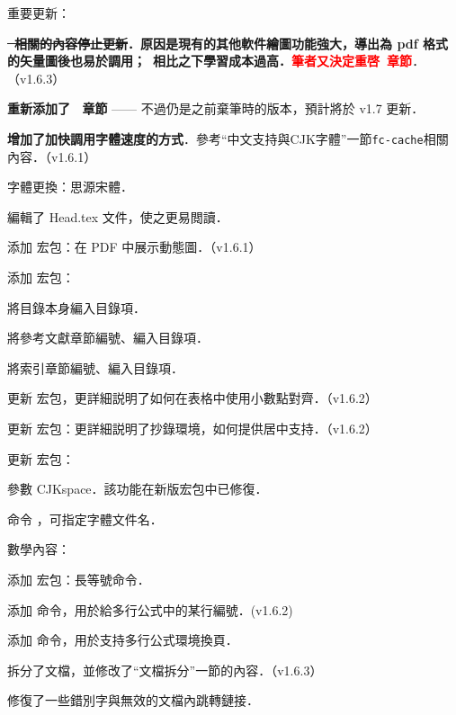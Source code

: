 \begin{feai}
\item 重要更新：
  \begin{feai}
  \item \textbf{\sout{\tikzz\  相關的內容停止更新}．原因是現有的其他軟件繪圖功能強大，導出為 pdf 格式的矢量圖後也易於調用；\tikzz\  相比之下學習成本過高．}\textcolor{red}{\textbf{筆者又決定重啓\tikzz\ 章節}}．（v1.6.3）
  \item \textbf{重新添加了 \tikzz\  章節} —— 不過仍是之前棄筆時的版本，預計將於 v1.7 更新．
  \item \textbf{增加了加快\xelatex 調用字體速度的方式}．參考“中文支持與CJK字體”一節\texttt{fc-cache}相關內容．（v1.6.1）
  \end{feai}
\item 字體更換：思源宋體．
\item 編輯了 Head.tex 文件，使之更易閲讀．
\item [添加]宏包：在 PDF 中展示動態圖．（v1.6.1）
\item [添加]宏包：
  \begin{feai}
  \item 將目錄本身編入目錄項．
  \item 將參考文獻章節編號、編入目錄項．
  \item 將索引章節編號、編入目錄項．
  \end{feai}
\item [更新]宏包，更詳細説明了如何在表格中使用小數點對齊．（v1.6.2）
\item [更新]宏包：更詳細説明了抄錄環境，如何提供居中支持．（v1.6.2）
\item [更新]宏包：
  \begin{feai}
  \item 參數 CJKspace．該功能在新版宏包中已修復．
  \item 命令 ，可指定字體文件名．
  \end{feai}
\item 數學內容：
  \begin{feai}
  \item [添加]宏包：長等號命令．
  \item [添加]命令，用於給多行公式中的某行編號．(v1.6.2)
  \item [添加]命令，用於支持多行公式環境換頁．
  \end{feai}
\item 拆分了文檔，並修改了“文檔拆分”一節的內容．（v1.6.3）
\item 修復了一些錯別字與無效的文檔內跳轉鏈接．
\end{feai}


